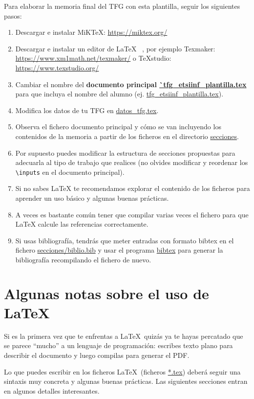 Para elaborar la memoria final del TFG con esta plantilla, seguir los siguientes pasos:
\begin{enumerate}
\item Descargar e instalar MiKTeX:  \url{https://miktex.org/}
\item Descargar e instalar un editor de \LaTeX~ , por ejemplo Texmaker:
\url{https://www.xm1math.net/texmaker/} o TeXstudio: \url{https://www.texstudio.org/}
\item Cambiar el nombre del \textbf{documento principal
    \url{`tfg_etsiinf_plantilla.tex}} para que incluya el nombre del
  alumno (ej. \url{tfg_etsiinf_plantilla.tex}).
\item Modifica los datos de tu TFG en \url{datos_tfg.tex}.
\item Observa el fichero documento principal y cómo se van incluyendo
  los contenidos de la memoria a partir de los ficheros en el
  directorio \url{secciones}.
\item Por supuesto puedes modificar la estructura de secciones
  propuestas para adecuarla al tipo de trabajo que realices (no
  olvides modificar y reordenar los \verb|\inputs| en el documento
  principal).
\item Si no sabes LaTeX te recomendamos explorar el contenido de los
  ficheros para aprender un uso básico y algunas buenas prácticas.
\item A veces es bastante común tener que compilar varias veces el
  fichero para que LaTeX calcule las referencias correctamente.
\item Si usas bibliografía, tendrás que meter entradas con formato
  bibtex en el fichero \url{secciones/biblio.bib} y usar el programa
  \url{bibtex} para generar la bibliografía recompilando el fichero de
  nuevo.
\end{enumerate}

\section{Algunas notas sobre el uso de \LaTeX}
\label{sec:latex}

Si es la primera vez que te enfrentas a \LaTeX\ quizás ya te hayas
percatado que se parece ``mucho'' a un lenguaje de programación:
escribes texto plano para describir el documento y luego compilas para
generar el PDF.

Lo que puedes escribir en los ficheros \LaTeX\ (ficheros \url{*.tex})
deberá seguir una sintaxis muy concreta y algunas buenas
prácticas. Las siguientes secciones entran en algunos detalles
interesantes.

